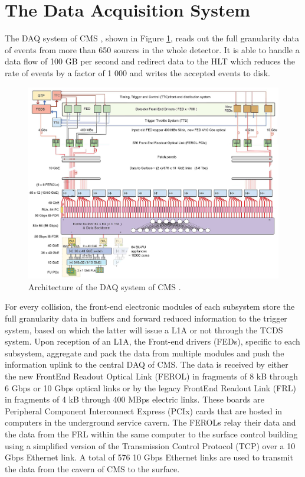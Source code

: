   \section{The Data Acquisition System}
  \label{sec:I-3-daq}

    The DAQ system of CMS \cite{Bawej:2015tmz}, shown in Figure \ref{fig:I-3-daq}, reads out the full granularity data of events from more than 650 sources in the whole detector. It is able to handle a data flow of 100 GB per second and redirect data to the HLT which reduces the rate of events by a factor of 1 000 and writes the accepted events to disk. \\

      \begin{figure}[h!]
        \centering
        \includegraphics[width=\textwidth]{img/I-3-cms/daq.png}
        \caption{Architecture of the DAQ system of CMS \cite{Bawej:2015tmz}.}
        \label{fig:I-3-daq}
      \end{figure}

    For every collision, the front-end electronic modules of each subsystem store the full granularity data in buffers and forward reduced information to the trigger system, based on which the latter will issue a L1A or not through the TCDS system. Upon reception of an L1A, the Front-end drivers (FEDs), specific to each subsystem, aggregate and pack the data from multiple modules and push the information uplink to the central DAQ of CMS. The data is received by either the new FrontEnd Readout Optical Link (FEROL) in fragments of 8 kB through 6 Gbps or 10 Gbps optical links or by the legacy FrontEnd Readout Link (FRL) in fragments of 4 kB through 400 MBps electric links. These boards are Peripheral Component Interconnect Express (PCIx) cards that are hosted in computers in the underground service cavern. The FEROLs relay their data and the data from the FRL within the same computer to the surface control building using a simplified version of the Transmission Control Protocol (TCP) over a 10 Gbps Ethernet link. A total of 576 10 Gbps Ethernet links are used to transmit the data from the cavern of CMS to the surface. \\

